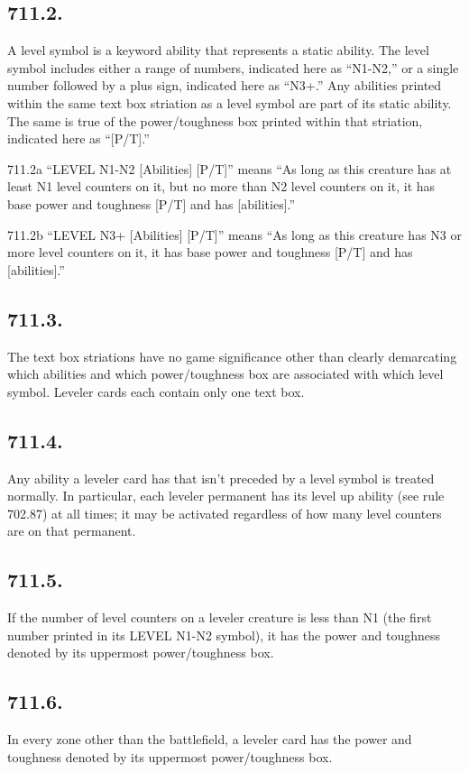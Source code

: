 \subsection*{711.2.}
A level symbol is a keyword ability that represents a static ability. The level symbol includes either a range of numbers, indicated here as “N1-N2,” or a single number followed by a plus sign, indicated here as “N3+.” Any abilities printed within the same text box striation as a level symbol are part of its static ability. The same is true of the power/toughness box printed within that striation, indicated here as “[P/T].”

711.2a “{LEVEL N1-N2} [Abilities] [P/T]” means “As long as this creature has at least N1 level counters on it, but no more than N2 level counters on it, it has base power and toughness [P/T] and has [abilities].”

711.2b “{LEVEL N3+} [Abilities] [P/T]” means “As long as this creature has N3 or more level counters on it, it has base power and toughness [P/T] and has [abilities].”

\subsection*{711.3.}
The text box striations have no game significance other than clearly demarcating which abilities and which power/toughness box are associated with which level symbol. Leveler cards each contain only one text box.

\subsection*{711.4.}
Any ability a leveler card has that isn’t preceded by a level symbol is treated normally. In particular, each leveler permanent has its level up ability (see rule 702.87) at all times; it may be activated regardless of how many level counters are on that permanent.

\subsection*{711.5.}
If the number of level counters on a leveler creature is less than N1 (the first number printed in its {LEVEL N1-N2} symbol), it has the power and toughness denoted by its uppermost power/toughness box.

\subsection*{711.6.}
In every zone other than the battlefield, a leveler card has the power and toughness denoted by its uppermost power/toughness box.

